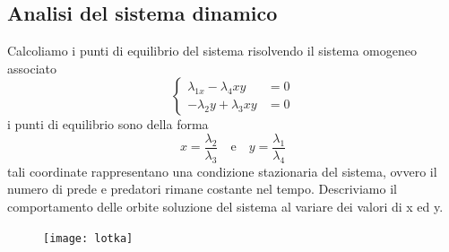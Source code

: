 \subsection{Analisi del sistema dinamico}

Calcoliamo i punti di equilibrio del sistema risolvendo il sistema omogeneo associato
\begin{equation*}
\left\{\begin{aligned}
\lambda_{1 x}-\lambda_4 x y & =0 \\
-\lambda_2 y+\lambda_3 x y & =0
\end{aligned}\right.
\end{equation*}
i punti di equilibrio sono della forma 
\begin{equation}
	x = \frac{\lambda_2}{\lambda_3} \quad \text{e} \quad y = \frac{\lambda_1}{\lambda_4}
\end{equation}
tali coordinate rappresentano una condizione stazionaria del sistema, ovvero il numero di prede e predatori rimane costante nel tempo. Descriviamo il comportamento delle orbite soluzione del sistema al variare dei valori di x ed y.

 
\begin{figure}[!ht]
\vspace{0.1in}
\texttt{[image: lotka]}	
\centering
\vspace{0.1in}
\end{figure}

